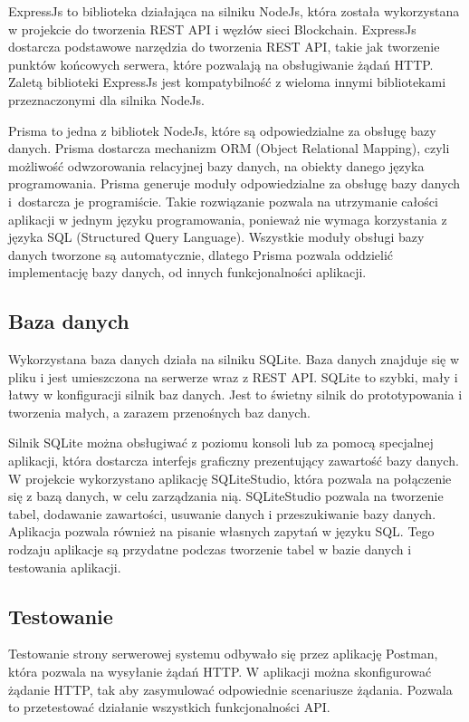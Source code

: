 \documentclass[a4paper,12pt]{book}
\begin{document}
ExpressJs to biblioteka działająca na silniku NodeJs, która została wykorzystana w projekcie do tworzenia REST API i węzłów sieci Blockchain. ExpressJs dostarcza podstawowe narzędzia do tworzenia REST API, takie jak tworzenie punktów końcowych serwera, które pozwalają na obsługiwanie żądań HTTP. Zaletą biblioteki ExpressJs jest kompatybilność z wieloma innymi bibliotekami przeznaczonymi dla silnika NodeJs.

Prisma to jedna z bibliotek NodeJs, które są odpowiedzialne za obsługę bazy danych. Prisma dostarcza mechanizm ORM (Object Relational Mapping), czyli możliwość odwzorowania relacyjnej bazy danych, na obiekty danego języka programowania. Prisma generuje moduły odpowiedzialne za obsługę bazy danych i~dostarcza je programiście. Takie rozwiązanie pozwala na utrzymanie całości aplikacji w jednym języku programowania, ponieważ nie wymaga korzystania z języka SQL (Structured Query Language). Wszystkie moduły obsługi bazy danych tworzone są automatycznie, dlatego Prisma pozwala oddzielić implementację bazy danych, od innych funkcjonalności aplikacji.

\subsection {Baza danych}

Wykorzystana baza danych działa na silniku SQLite. Baza danych znajduje się w pliku i jest umieszczona na serwerze wraz z REST API. SQLite to szybki, mały i łatwy w konfiguracji silnik baz danych. Jest to świetny silnik do prototypowania i tworzenia małych, a zarazem przenośnych baz danych.

Silnik SQLite można obsługiwać z poziomu konsoli lub za pomocą specjalnej aplikacji, która dostarcza interfejs graficzny prezentujący zawartość bazy danych. W projekcie wykorzystano aplikację SQLiteStudio, która pozwala na połączenie się z bazą danych, w celu zarządzania nią. SQLiteStudio pozwala na tworzenie tabel, dodawanie zawartości, usuwanie danych i przeszukiwanie bazy danych. Aplikacja pozwala również na pisanie własnych zapytań w języku SQL. Tego rodzaju aplikacje są przydatne podczas tworzenie tabel w bazie danych i testowania aplikacji.

\subsection{Testowanie}

Testowanie strony serwerowej systemu odbywało się przez aplikację Postman, która pozwala na wysyłanie żądań HTTP. W aplikacji można skonfigurować żądanie HTTP, tak aby zasymulować odpowiednie scenariusze żądania. Pozwala to przetestować działanie wszystkich funkcjonalności API.
\end{document}
